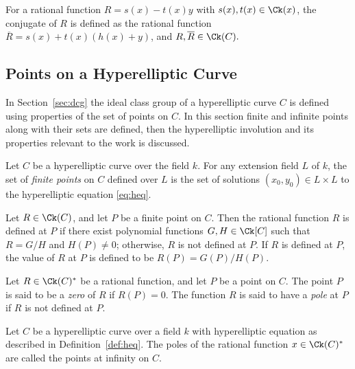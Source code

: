 \bd\label{def:ratconj}
For a rational function $R = s(x) - t(x)y$ with $s(x),t(x) \in \Ck(x)$, the
conjugate of $R$ is defined as the rational function $\overline{R} = s(x) +
t(x)(h(x) + y)$, and $R,\overline{R} \in \Ck(C).$
\ed



\subsection{Points on a Hyperelliptic Curve}\label{sec:pointsonHEC}
In Section~\ref{sec:dcg} the ideal class group of a hyperelliptic curve $C$ is
defined using properties of the set of points on $C$.  In this section finite
and infinite points along with their sets are defined, then the hyperelliptic
involution and its properties relevant to the work is discussed.

\bd \label{def:finset}
\cite[Adapted from Definition~12.4.8]{HandbookFF_2013} Let $C$ be a
hyperelliptic curve over the field $k$. For any extension field $L$ of $k$, the
set of \emph{finite points} on $C$ defined over $L$ is the set of solutions
$(x_0,y_0) \in L \times L$ to the hyperelliptic equation \eqref{eq:heq}.
\ed

\bd \label{def:rationalvalue}
\cite[Definition~14]{MenezesWuZuccherato_elementary_1996}  Let $R \in
\Ck(C)$, and let $P$ be a finite point on $C$. Then the rational function
$R$ is  defined at $P$ if there exist polynomial functions $G,H \in \Ck[C]$
such that $R = G/H$ and $H(P) \neq 0$; otherwise, $R$ is not defined
at $P$. If $R$ is defined at $P$, the value of $R$ at $P$ is defined
to be $R(P) = G(P)/H(P).$
\ed

\bd \label{def:zeropole}
\cite[Adapted from Definition~18]{MenezesWuZuccherato_elementary_1996}  Let $R
\in \Ck(C)^{\ast}$ be a rational function, and let $P$ be a point on $C$.
The point $P$ is said to be a \emph{zero} of $R$ if $R(P) = 0$. The function $R$
is said to have a \emph{pole} at $P$ if $R$ is not defined at $P$.
\ed


\bd \label{def:infpoint} \cite[Adapted from Definition~12.4.7]{HandbookFF_2013}
Let $C$ be a hyperelliptic curve over a field $k$ with hyperelliptic equation as
described in Definition~\ref{def:heq}. The poles of the rational function $x \in
\Ck(C)^{\ast}$ are called the points at infinity on $C$.
\ed

